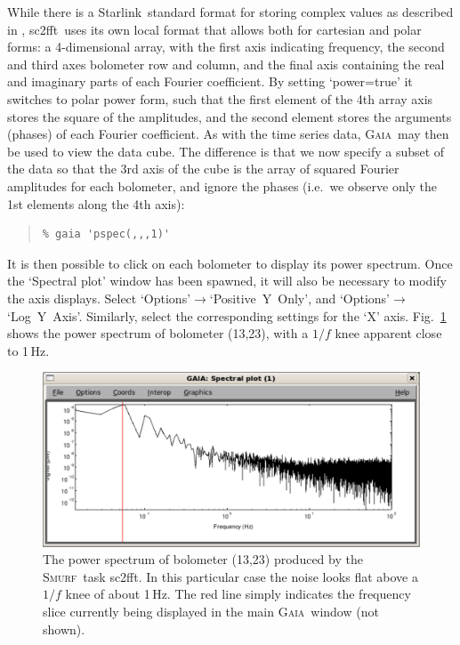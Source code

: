 \documentclass[twoside,11pt]{article}
\newcommand{\htmladdnormallink}[2]{#1}
\newcommand{\xref}[3]{#1}
\renewcommand{\_}{\texttt{\symbol{95}}}
\newenvironment{myquote}{\begin{quote}\begin{small}}{\end{small}\end{quote}}
\newcommand{\starlink}{\htmladdnormallink{Starlink}{http://starlink.jach.hawaii.edu}}
\newcommand{\gaia}{\xref{\textsc{Gaia}}{sun214}{}}
\newcommand{\smurf}{\xref{\textsc{Smurf}}{sun258}{}}
\newcommand{\task}[1]{\textsf{#1}}
\newcommand{\fft}{\xref{\task{sc2fft}}{sun258}{SC2FFT}}
\begin{document}
While there is a \starlink\ standard format for storing complex values
as described in \cite{ssds}, \fft\ uses its own local format that
allows both for cartesian and polar forms: a 4-dimensional array, with
the first axis indicating frequency, the second and third axes
bolometer row and column, and the final axis containing the real and
imaginary parts of each Fourier coefficient. By setting `power=true'
it switches to polar power form, such that the first element of the
4th array axis stores the square of the amplitudes, and the second
element stores the arguments (phases) of each Fourier coefficient. As
with the time series data, \gaia\ may then be used to view the data
cube. The difference is that we now specify a subset of the data so
that the 3rd axis of the cube is the array of squared Fourier
amplitudes for each bolometer, and ignore the phases (i.e.~we observe
only the 1st elements along the 4th axis):

\begin{myquote}
\begin{verbatim}
% gaia 'pspec(,,,1)'
\end{verbatim}
\end{myquote}

It is then possible to click on each bolometer to display its power
spectrum. Once the `Spectral plot' window has been spawned, it will
also be necessary to modify the axis displays. Select
`Options'$\rightarrow$`Positive~Y~Only', and
`Options'$\rightarrow$`Log~Y~Axis'. Similarly, select the
corresponding settings for the `X' axis. Fig.~\ref{fig:pspec} shows
the power spectrum of bolometer (13,23), with a $1/f$ knee apparent
close to 1\,Hz.

\begin{figure}
\begin{center}
\includegraphics[width=\linewidth]{sc19_pspec}
\caption{The power spectrum of bolometer (13,23) produced by the
  \smurf\ task \fft. In this particular case the noise looks flat
  above a $1/f$ knee of about 1\,Hz. The red line simply indicates the
  frequency slice currently being displayed in the main \gaia\ window
  (not shown).}
\label{fig:pspec}
\end{center}
\end{figure}
\end{document}

